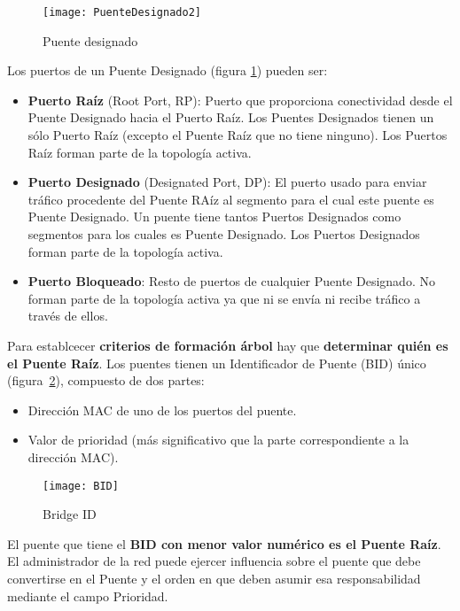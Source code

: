 \documentclass[10pt,portrait, twocolumn]{article}
\begin{document}
\begin{figure}[!ht]	
	\centering
    	\texttt{[image: PuenteDesignado2]}
	\caption{Puente designado}
	\label{fig:pte}
\end{figure} 

Los puertos de un Puente Designado (figura \ref{fig:pte}) pueden ser:



	\begin{itemize}
		\item \textbf{Puerto Raíz} (Root Port, RP): Puerto que proporciona conectividad desde el Puente Designado hacia el Puerto Raíz. Los Puentes Designados tienen un sólo Puerto Raíz (excepto el Puente Raíz que no tiene ninguno). Los Puertos Raíz forman parte de la topología activa.
		\item \textbf{Puerto Designado} (Designated Port, DP): El puerto usado para enviar tráfico procedente del Puente RAíz al segmento para el cual este puente es Puente Designado. Un puente tiene tantos Puertos Designados como segmentos para los cuales es Puente Designado. Los Puertos Designados forman parte de la topología activa.
		\item \textbf{Puerto Bloqueado}: Resto de puertos de cualquier Puente Designado. No forman parte de la topología activa ya que ni se envía ni recibe tráfico a través de ellos.
	\end{itemize}

Para establcecer \textbf{criterios de formación árbol} hay que \textbf{determinar quién es el Puente Raíz}. Los puentes tienen un Identificador de Puente (BID) único (figura \ref{fig:bid}), compuesto de dos partes:

	\begin{itemize}
		\item Dirección MAC de uno de los puertos del puente.
		\item Valor de prioridad (más significativo que la parte correspondiente a la dirección MAC).
	\end{itemize}

\begin{figure}[!ht]	
	\centering
    	\texttt{[image: BID]}
	\caption{Bridge ID}
	\label{fig:bid}
\end{figure} 

El puente que tiene el \textbf{BID con menor valor numérico es el Puente Raíz}. El administrador de la red puede ejercer influencia sobre el puente que debe convertirse en el Puente y el orden en que deben asumir esa responsabilidad mediante el campo Prioridad. 
\end{document}
